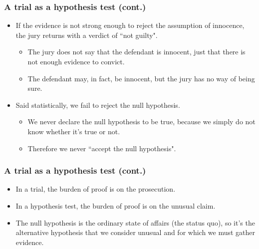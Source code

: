 \documentclass[slidestop,compress,mathserif]{beamer}
\begin{document}
\begin{frame}
\frametitle{A trial as a hypothesis test (cont.)}

\begin{itemize}

\item If the evidence is not strong enough to reject the assumption of innocence, the jury returns with a verdict of ``not guilty".
\begin{itemize}
\item The jury does not say that the defendant is innocent, just that there is not enough evidence to convict.
\item The defendant may, in fact, be innocent, but the jury has no way of being sure.
\end{itemize}

\item Said statistically, we fail to reject the null hypothesis.
\begin{itemize}
\item We never declare the null hypothesis to be true, because we simply do not know whether it's true or not.
\item Therefore we never ``accept the null hypothesis".
\end{itemize}

\end{itemize}

\end{frame}


\begin{frame}
\frametitle{A trial as a hypothesis test (cont.)}

\begin{itemize}

\item In a trial, the burden of proof is on the prosecution.

\item In a hypothesis test, the burden of proof is on the unusual claim.

\item The null hypothesis is the ordinary state of affairs (the status quo), so it's the alternative hypothesis that we consider unusual and for which we must gather evidence.

\end{itemize}

\end{frame}

\end{document}
